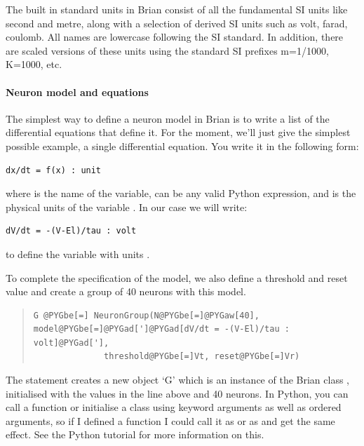 \documentclass[letterpaper,10pt,english]{manual}
\begin{document}
The built in standard units in Brian consist of all the fundamental
SI units like second and metre, along with a selection of derived
SI units such as volt, farad, coulomb. All names are lowercase
following the SI standard. In addition, there are scaled versions
of these units using the standard SI prefixes m=1/1000, K=1000, etc.


\paragraph{Neuron model and equations}

The simplest way to define a neuron model in Brian is to write a list
of the differential equations that define it. For the moment, we'll just
give the simplest possible example, a single differential equation. You
write it in the following form:

\begin{Verbatim}[commandchars=@\[\]]
dx/dt = f(x) : unit
\end{Verbatim}

where  is the name of the variable,  can be any valid Python
expression, and  is the physical units of the variable . In our
case we will write:

\begin{Verbatim}[commandchars=@\[\]]
dV/dt = -(V-El)/tau : volt
\end{Verbatim}

to define the variable  with units .

To complete the specification of the model, we also define a threshold and reset
value and create a group of 40 neurons with this model.
\begin{quote}

\begin{Verbatim}[commandchars=@\[\]]
G @PYGbe[=] NeuronGroup(N@PYGbe[=]@PYGaw[40], model@PYGbe[=]@PYGad[']@PYGad[dV/dt = -(V-El)/tau : volt]@PYGad['],
              threshold@PYGbe[=]Vt, reset@PYGbe[=]Vr)
\end{Verbatim}
\end{quote}

The statement creates a new object `G' which is an instance of the
Brian class \hyperlink{brian.NeuronGroup}{}, initialised with the values in the
line above and 40 neurons. In Python, you can call a function or initialise
a class using keyword arguments as well as ordered arguments, so
if I defined a function  I could call it as  or
as  and get the same effect. See the Python tutorial
for more information on this.
\end{document}
